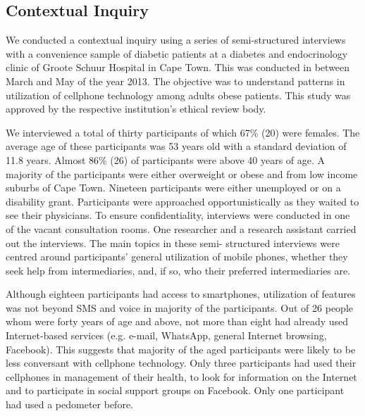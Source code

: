 \documentclass{sig-alternate}
\begin{document}
\subsection{Contextual Inquiry}

We conducted a contextual inquiry using a series of semi-structured interviews
with 
a convenience sample of
diabetic patients at a diabetes and endocrinology clinic of Groote Schuur
Hospital in Cape Town. This was conducted in between March and May of the year
2013. The objective was to understand patterns in utilization of cellphone
technology among adults obese patients. This study was approved by the
respective institution's ethical review body.

We interviewed a total of thirty participants of which 67\% (20) were
females.  The average age of these participants was 53 years old with a
standard deviation of 11.8 years.  Almost 86\% (26) of participants were
above 40 years of age. A majority of the participants were either overweight or
obese and from low income suburbs of Cape Town. Nineteen participants were either
unemployed or on a disability grant. Participants were approached 
opportunistically as
they waited to see their physicians. To ensure confidentiality, interviews
were conducted in one of the vacant consultation rooms. One researcher and a
research assistant carried out the interviews. The main topics in these semi-
structured interviews were centred around participants' general utilization of
mobile phones, whether they seek help from intermediaries, and, if so, who their 
preferred intermediaries are.

Although eighteen participants had access to smartphones, utilization of
features was not beyond SMS and voice in majority of the participants. Out of
26 people whom were forty years of age and above, not more than eight had
already used Internet-based services (e.g. e-mail, WhatsApp, general Internet
browsing, Facebook). This suggests that majority of the aged
participants were likely to be less conversant with cellphone technology. Only
three participants had used their cellphones in management of their health,
to look for information on the Internet and to participate in social
support groups on Facebook. Only one participant had used a pedometer before.
\end{document}
